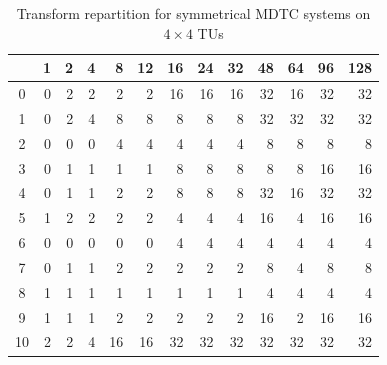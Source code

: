 \documentclass[11pt,a4paper,openright,twoside]{book}
\numberwithin{equation}{section} %
\numberwithin{figure}{section} %
\numberwithin{table}{section} %
\begin{document}
\begin{table}[h]
	\centering
	\small
	\def\arraystretch{0.85}
	\begin{tabular}{c|rrrrrrrrrrrr}
		\diagbox{\acs{IPM}}{System} &
		1 & 2 & 4 & 8  & 12 & 16 & 24 & 32 & 48 & 64 & 96 & 128 \\
		\hline
		0  & 0 & 2 & 2 & 2  & 2  & 16 & 16 & 16 & 32 & 16 & 32 & 32 \\
		1  & 0 & 2 & 4 & 8  & 8  & 8  & 8  & 8  & 32 & 32 & 32 & 32 \\
		2  & 0 & 0 & 0 & 4  & 4  & 4  & 4  & 4  & 8  & 8  & 8  & 8 \\
		3  & 0 & 1 & 1 & 1  & 1  & 8  & 8  & 8  & 8  & 8  & 16 & 16 \\
		4  & 0 & 1 & 1 & 2  & 2  & 8  & 8  & 8  & 32 & 16 & 32 & 32 \\
		5  & 1 & 2 & 2 & 2  & 2  & 4  & 4  & 4  & 16 & 4  & 16 & 16 \\
		6  & 0 & 0 & 0 & 0  & 0  & 4  & 4  & 4  & 4  & 4  & 4  & 4 \\
		7  & 0 & 1 & 1 & 2  & 2  & 2  & 2  & 2  & 8  & 4  & 8  & 8 \\
		8  & 1 & 1 & 1 & 1  & 1  & 1  & 1  & 1  & 4  & 4  & 4  & 4 \\
		9  & 1 & 1 & 1 & 2  & 2  & 2  & 2  & 2  & 16 & 2  & 16 & 16 \\
		10 & 2 & 2 & 4 & 16 & 16 & 32 & 32 & 32 & 32 & 32 & 32 & 32 \\
	\end{tabular}
	\caption{Transform repartition for symmetrical \acs{MDTC} systems on
	$4\times4$ \acsp{TU}}
	\label{tab:config_sym_mdtc_4}
\end{table}
\end{document}
